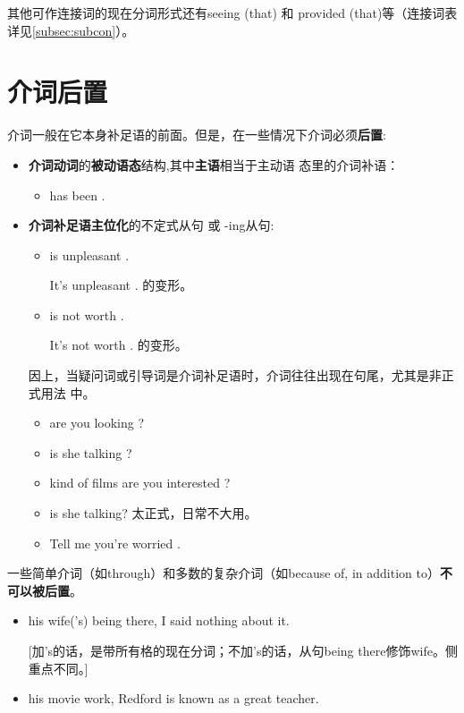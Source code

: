 其他可作连接词的现在分词形式还有seeing (that) 和 provided (that)等（连接词表
详见\cref{subsec:subcon}）。


\section{介词后置}

介词一般在它本身补足语的前面。但是，在一些情况下介词必须\textbf{后置}:
\begin{itemize}
\item \textbf{介词动词}的\textbf{被动语态}结构,其中\textbf{主语}相当于主动语
  态里的介词补语：
  \begin{itemize}
  \item {} has been .
  \end{itemize}

\item \textbf{介词补足语主位化}的不定式从句 或 -ing从句:
  \begin{itemize}
  \item {} is unpleasant .

    It's unpleasant . 的变形。

  \item {} is not worth .

    It's not worth . 的变形。
  \end{itemize}

  因上，当疑问词或引导词是介词补足语时，介词往往出现在句尾，尤其是非正式用法
  中。
  \begin{itemize}
  \item {} are you looking ?
  \item {} is she talking ?
  \item {} kind of films are you interested ?
  \item {} is she talking? 太正式，日常不大用。
  \item Tell me  you're worried .
  \end{itemize}
\end{itemize}


\item 一些简单介词（如through）和多数的复杂介词（如because of, in addition
  to）\textbf{不可以被后置}。
  \begin{itemize}
  \item {} his wife('s) being there, I said nothing about it.

    [加's的话，是带所有格的现在分词；不加's的话，从句being there修饰wife。侧
    重点不同。]
  \item {} his movie work, Redford is known as a great teacher.
  \end{itemize}

